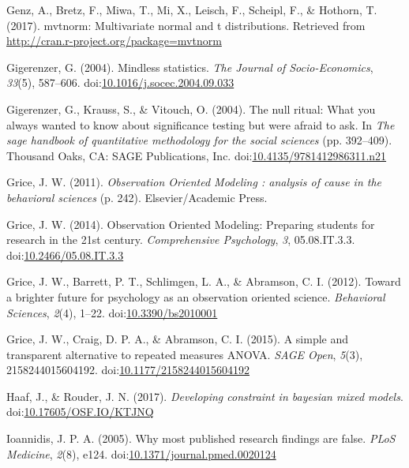 \documentclass[english,man]{apa6}
\theoremstyle{definition}
\theoremstyle{definition}
\theoremstyle{definition}
\theoremstyle{remark}
\begin{document}
\hypertarget{ref-Genz2017}{}
Genz, A., Bretz, F., Miwa, T., Mi, X., Leisch, F., Scheipl, F., \&
Hothorn, T. (2017). mvtnorm: Multivariate normal and t distributions.
Retrieved from \url{http://cran.r-project.org/package=mvtnorm}

\hypertarget{ref-Gigerenzer2004}{}
Gigerenzer, G. (2004). Mindless statistics. \emph{The Journal of
Socio-Economics}, \emph{33}(5), 587--606.
doi:\href{https://doi.org/10.1016/j.socec.2004.09.033}{10.1016/j.socec.2004.09.033}

\hypertarget{ref-Gigerenzer2004a}{}
Gigerenzer, G., Krauss, S., \& Vitouch, O. (2004). The null ritual: What
you always wanted to know about significance testing but were afraid to
ask. In \emph{The sage handbook of quantitative methodology for the
social sciences} (pp. 392--409). Thousand Oaks, CA: SAGE Publications,
Inc.
doi:\href{https://doi.org/10.4135/9781412986311.n21}{10.4135/9781412986311.n21}

\hypertarget{ref-Grice2011}{}
Grice, J. W. (2011). \emph{Observation Oriented Modeling : analysis of
cause in the behavioral sciences} (p. 242). Elsevier/Academic Press.

\hypertarget{ref-Grice2014}{}
Grice, J. W. (2014). Observation Oriented Modeling: Preparing students
for research in the 21st century. \emph{Comprehensive Psychology},
\emph{3}, 05.08.IT.3.3.
doi:\href{https://doi.org/10.2466/05.08.IT.3.3}{10.2466/05.08.IT.3.3}

\hypertarget{ref-Grice2012}{}
Grice, J. W., Barrett, P. T., Schlimgen, L. A., \& Abramson, C. I.
(2012). Toward a brighter future for psychology as an observation
oriented science. \emph{Behavioral Sciences}, \emph{2}(4), 1--22.
doi:\href{https://doi.org/10.3390/bs2010001}{10.3390/bs2010001}

\hypertarget{ref-Grice2015}{}
Grice, J. W., Craig, D. P. A., \& Abramson, C. I. (2015). A simple and
transparent alternative to repeated measures ANOVA. \emph{SAGE Open},
\emph{5}(3), 2158244015604192.
doi:\href{https://doi.org/10.1177/2158244015604192}{10.1177/2158244015604192}

\hypertarget{ref-Haaf2017}{}
Haaf, J., \& Rouder, J. N. (2017). \emph{Developing constraint in
bayesian mixed models}.
doi:\href{https://doi.org/10.17605/OSF.IO/KTJNQ}{10.17605/OSF.IO/KTJNQ}

\hypertarget{ref-Ioannidis2005}{}
Ioannidis, J. P. A. (2005). Why most published research findings are
false. \emph{PLoS Medicine}, \emph{2}(8), e124.
doi:\href{https://doi.org/10.1371/journal.pmed.0020124}{10.1371/journal.pmed.0020124}
\end{document}
